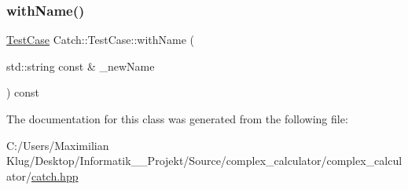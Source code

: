 \subsubsection{\texorpdfstring{with\+Name()}{withName()}}
{\footnotesize\ttfamily \mbox{\hyperlink{class_catch_1_1_test_case}{Test\+Case}} Catch\+::\+Test\+Case\+::with\+Name (\begin{DoxyParamCaption}\item[{std\+::string const \&}]{\+\_\+new\+Name }\end{DoxyParamCaption}) const}



The documentation for this class was generated from the following file\+:\begin{DoxyCompactItemize}
\item 
C\+:/\+Users/\+Maximilian Klug/\+Desktop/\+Informatik\+\_\+\_\+\+Projekt/\+Source/complex\+\_\+calculator/complex\+\_\+calculator/\mbox{\hyperlink{catch_8hpp}{catch.\+hpp}}\end{DoxyCompactItemize}
